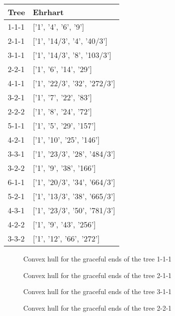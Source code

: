 \documentclass{article}
\begin{document}
\begin{center}
              \begin{tabular}{| l | l |}
              \hline
              Tree & Ehrhart\\ 
              \hline 
1-1-1 & ['1', '4', '6', '9']\\ 
\hline
2-1-1 & ['1', '14/3', '4', '40/3']\\ 
\hline
3-1-1 & ['1', '14/3', '8', '103/3']\\ 
\hline
2-2-1 & ['1', '6', '14', '29']\\ 
\hline
4-1-1 & ['1', '22/3', '32', '272/3']\\ 
\hline
3-2-1 & ['1', '7', '22', '83']\\ 
\hline
2-2-2 & ['1', '8', '24', '72']\\ 
\hline
5-1-1 & ['1', '5', '29', '157']\\ 
\hline
4-2-1 & ['1', '10', '25', '146']\\ 
\hline
3-3-1 & ['1', '23/3', '28', '484/3']\\ 
\hline
3-2-2 & ['1', '9', '38', '166']\\ 
\hline
6-1-1 & ['1', '20/3', '34', '664/3']\\ 
\hline
5-2-1 & ['1', '13/3', '38', '665/3']\\ 
\hline
4-3-1 & ['1', '23/3', '50', '781/3']\\ 
\hline
4-2-2 & ['1', '9', '43', '256']\\ 
\hline
3-3-2 & ['1', '12', '66', '272']\\ 
\hline
\hline
              \end{tabular}
              \end{center}\begin{figure}[H]
	\center
	
                \caption{Convex hull for the graceful ends of the tree 1-1-1}
\end{figure}
\begin{figure}[H]
	\center
	
                \caption{Convex hull for the graceful ends of the tree 2-1-1}
\end{figure}
\begin{figure}[H]
	\center
	
                \caption{Convex hull for the graceful ends of the tree 3-1-1}
\end{figure}
\begin{figure}[H]
	\center
	
                \caption{Convex hull for the graceful ends of the tree 2-2-1}
\end{figure}
\end{document}
